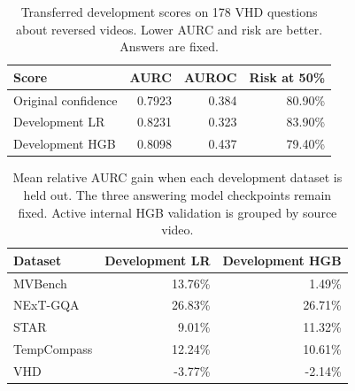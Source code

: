 \begin{table}[t]
\centering
\caption{Transferred development scores on 178 VHD questions about reversed videos. Lower AURC and risk are better. Answers are fixed.}
\label{tab:vhd-transferred-scores}
\begin{tabular}{lrrr}
\toprule
Score & AURC & AUROC & Risk at 50\% \\
\midrule
Original confidence & 0.7923 & 0.384 & 80.90\% \\
Development LR & 0.8231 & 0.323 & 83.90\% \\
Development HGB & 0.8098 & 0.437 & 79.40\% \\
\bottomrule
\end{tabular}
\end{table}

\begin{table}[t]
\centering
\caption{Mean relative AURC gain when each development dataset is held out. The three answering model checkpoints remain fixed. Active internal HGB validation is grouped by source video.}
\label{tab:fixed-checkpoint-transfer}
\begin{tabular}{lrr}
\toprule
Dataset & Development LR & Development HGB \\
\midrule
MVBench & 13.76\% & 1.49\% \\
NExT-GQA & 26.83\% & 26.71\% \\
STAR & 9.01\% & 11.32\% \\
TempCompass & 12.24\% & 10.61\% \\
VHD & -3.77\% & -2.14\% \\
\bottomrule
\end{tabular}
\end{table}
